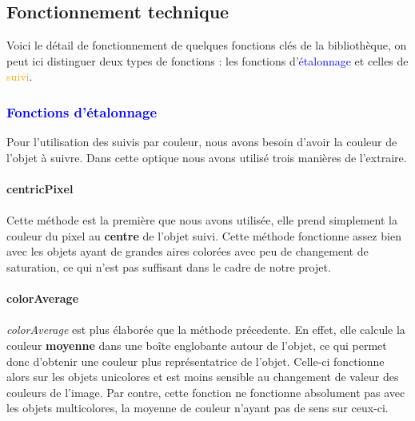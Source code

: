 \documentclass{report}
\begin{document}
				\subsection{Fonctionnement technique}
					Voici le détail de fonctionnement de quelques fonctions clés de la bibliothèque, on peut ici distinguer deux types de fonctions : les fonctions d'\textcolor{blue}{étalonnage} et celles de \textcolor{orange}{suivi}.
					\subsubsection{\textcolor{blue}{Fonctions d'étalonnage}}
						Pour l'utilisation des suivis par couleur, nous avons besoin d'avoir la couleur de l'objet à suivre. Dans cette optique nous avons utilisé trois manières de l'extraire.
						\paragraph{centricPixel} \paragraph{}
						Cette méthode est la première que nous avons utilisée, elle prend simplement la couleur du pixel au \textbf{centre} de l'objet suivi. Cette méthode fonctionne assez bien avec les objets ayant de grandes aires colorées avec peu de changement de saturation, ce qui n'est pas suffisant dans le cadre de notre projet.
						\paragraph{colorAverage} \paragraph{}
						\textit{colorAverage} est plus élaborée que la méthode précedente. En effet, elle calcule la couleur \textbf{moyenne} dans une boîte englobante autour de l'objet, ce qui permet donc d'obtenir une couleur plus représentatrice de l'objet. Celle-ci fonctionne alors sur les objets unicolores et est moins sensible au changement de valeur des couleurs de l'image. Par contre, cette fonction ne fonctionne absolument pas avec les objets multicolores, la moyenne de couleur n'ayant pas de sens sur ceux-ci.
\end{document}

